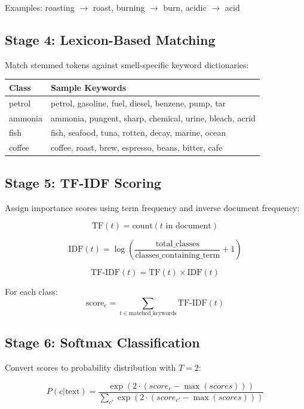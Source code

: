\documentclass[10pt]{article}
\begin{document}
Examples: roasting $\to$ roast, burning $\to$ burn, acidic $\to$ acid

\subsection{Stage 4: Lexicon-Based Matching}

Match stemmed tokens against smell-specific keyword dictionaries:

\begin{table}[H]
\centering
\small
\begin{tabular}{|l|l|}
\hline
\textbf{Class} & \textbf{Sample Keywords} \\
\hline
petrol & petrol, gasoline, fuel, diesel, benzene, pump, tar \\
ammonia & ammonia, pungent, sharp, chemical, urine, bleach, acrid \\
fish & fish, seafood, tuna, rotten, decay, marine, ocean \\
coffee & coffee, roast, brew, espresso, beans, bitter, cafe \\
\hline
\end{tabular}
\end{table}

\subsection{Stage 5: TF-IDF Scoring}

Assign importance scores using term frequency and inverse document frequency:

\[
\text{TF}(t) = \text{count}(t \text{ in document})
\]

\[
\text{IDF}(t) = \log\left(\frac{\text{total\_classes}}{\text{classes\_containing\_term}} + 1\right)
\]

\[
\text{TF-IDF}(t) = \text{TF}(t) \times \text{IDF}(t)
\]

For each class:
\[
\text{score}_c = \sum_{t \in \text{matched\_keywords}} \text{TF-IDF}(t)
\]

\subsection{Stage 6: Softmax Classification}

Convert scores to probability distribution with $T = 2$:

\[
P(c|\text{text}) = \frac{\exp(2 \cdot (score_c - \max(scores)))}{\sum_{c'} \exp(2 \cdot (score_{c'} - \max(scores)))}
\]
\end{document}

